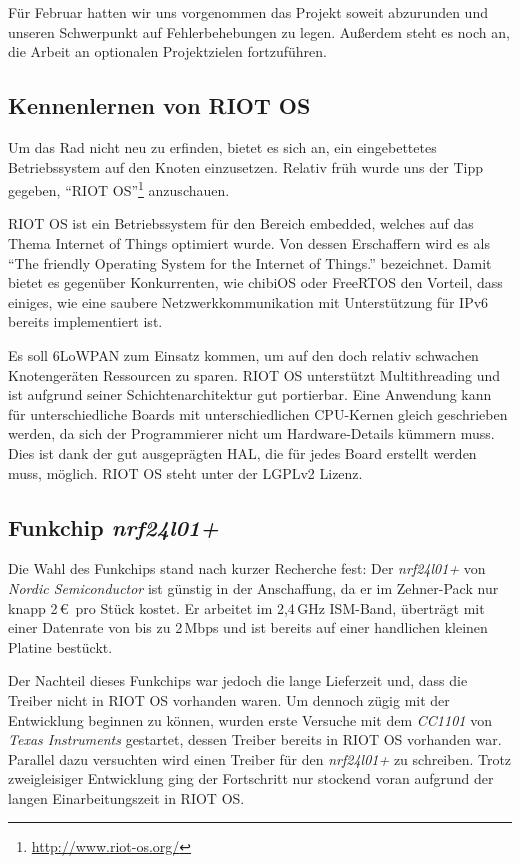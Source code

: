 \documentclass{IEEEtran}
\begin{document}
    Für Februar hatten wir uns vorgenommen das Projekt soweit abzurunden und 
    unseren Schwerpunkt auf Fehlerbehebungen zu legen. Außerdem steht es noch an, 
    die Arbeit an optionalen Projektzielen fortzuführen. 

    \subsection{Kennenlernen von RIOT OS}
    Um das Rad nicht neu zu erfinden, bietet es sich an, ein eingebettetes 
    Betriebssystem auf den Knoten einzusetzen. Relativ früh wurde uns der Tipp 
    gegeben, \enquote{RIOT OS}\footnote{\url{http://www.riot-os.org/}} anzuschauen.
    
    RIOT OS ist ein Betriebssystem für den Bereich embedded, welches auf das 
    Thema Internet of Things optimiert wurde.
    Von dessen Erschaffern wird es als \enquote{The friendly Operating System for the Internet of Things.} bezeichnet.
    Damit bietet es gegenüber Konkurrenten, wie chibiOS oder FreeRTOS den Vorteil, 
    dass einiges, wie eine saubere Netzwerkkommunikation mit Unterstützung für 
    IPv6 bereits implementiert ist. 
    
    Es soll \ac{6LoWPAN} zum Einsatz kommen, um auf den doch relativ schwachen 
    Knotengeräten Ressourcen zu sparen.
    RIOT OS unterstützt Multithreading und ist aufgrund seiner Schichtenarchitektur
    gut portierbar. Eine Anwendung kann für unterschiedliche Boards mit unterschiedlichen
    CPU-Kernen gleich geschrieben werden, da sich der Programmierer nicht um Hardware-Details
    kümmern muss. Dies ist dank der gut ausgeprägten \ac{HAL}, 
    die für jedes Board erstellt werden muss, möglich.
    RIOT OS steht unter der LGPLv2 Lizenz.

    \subsection{Funkchip \emph{nrf24l01+}}
    Die Wahl des Funkchips stand nach kurzer Recherche fest: Der \emph{nrf24l01+} von 
    \emph{Nordic Semiconductor} ist günstig in der Anschaffung, da er 
    im Zehner-Pack nur knapp 2\,\euro\ pro Stück kostet. Er arbeitet im 2,4\,GHz 
    ISM-Band, überträgt mit einer Datenrate von bis zu 2\,Mbps und ist bereits auf einer handlichen 
    kleinen Platine bestückt.
    
    Der Nachteil dieses Funkchips war jedoch die lange 
    Lieferzeit und, dass die Treiber nicht in RIOT OS vorhanden waren.
    Um dennoch zügig mit der Entwicklung beginnen zu können, wurden erste 
    Versuche mit dem \emph{CC1101} von \emph{Texas Instruments} gestartet, dessen Treiber 
    bereits in RIOT OS vorhanden war. Parallel dazu versuchten wird einen Treiber
    für den \emph{nrf24l01+} zu schreiben.
    Trotz zweigleisiger Entwicklung ging der 
    Fortschritt nur stockend voran aufgrund der langen Einarbeitungszeit in RIOT OS.
\end{document}
